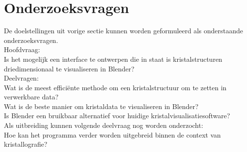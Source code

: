 \section{Onderzoeksvragen}
De doelstellingen uit vorige sectie kunnen worden geformuleerd als onderstaande onderzoeksvragen.
\\
Hoofdvraag:
\\
Is het mogelijk een interface te ontwerpen die in staat is kristalstructuren driedimensionaal te visualiseren in Blender?
\\
Deelvragen:
\\
Wat is de meest efficiënte methode om een kristalstructuur om te zetten in verwerkbare data?
\\
Wat is de beste manier om kristaldata te visualiseren in Blender?
\\
Is Blender een bruikbaar alternatief voor huidige kristalvisualisatiesoftware?
\\
Als uitbreiding kunnen volgende deelvraag nog worden onderzocht:
\\
Hoe kan het programma verder worden uitgebreid binnen de context van kristallografie? 


